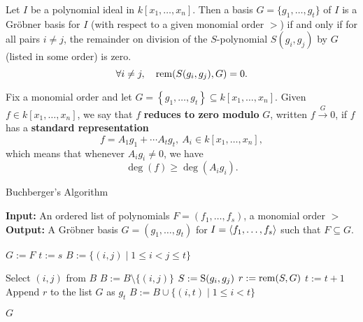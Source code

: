 \begin{theorem}\label{thm:Buchberger’s Criterion} %
    Let $I$ be a polynomial ideal in $k[x_1, \dots, x_n]$. 
    Then a basis $G = \{g_1, \dots , g_t\}$ of $I$ is a Gr{\"o}bner basis for $I$ (with respect to a given monomial order $>$)
    if and only if for all pairs $i \neq j$, the remainder on division of the $S$-polynomial $S(g_i, g_j)$ by $G$ (listed in some order) is zero.
    \[ \forall i \neq j, \quad \operatorname{rem}(S(g_i, g_j), G) = 0. \]
\end{theorem}

\begin{definition}\label{def:reduces_to_zero} %
    Fix a monomial order and let $G = \left\{g_1, \ldots , g_t\right\} \subseteq k[x_1, \ldots , x_n]$.
    Given $f \in k[x_1, \ldots , x_n]$, we say that $f$ \textbf{reduces to zero modulo} $G$, written $f \xrightarrow{G} 0$,
    if $f$ has a \textbf{standard representation}
    \[ f = A_1g_1 + \cdots A_tg_t,\ A_i \in k[x_1, \ldots , x_n],\]
    which means that whenever $A_ig_i \neq 0$, we have
    \[\operatorname{deg}(f) \geq \operatorname{deg}(A_ig_i).\]
\end{definition}

\begin{latexonly}
\begin{algorithm}\label{alg:Buchberger's_Algorithm} %
    \caption{Buchberger's Algorithm}
    \begin{algorithmic}[1]
    \Statex \textbf{Input:} An ordered list of polynomials $F = (f_1, \dots, f_s)$, a monomial order $>$
    \Statex \textbf{Output:} A Gr{\"o}bner basis $G = (g_1, \dots, g_t)$ for $I = \langle f_1, \dots, f_s \rangle$ such that $F \subseteq G$.
    
    \State $G := F$ 
    \State $t := s$ 
    \State $B := \{(i, j) \mid 1 \le i < j \le t\}$ 
    
        \State Select $(i, j)$ from $B$
        \State $B := B \setminus \{(i, j)\}$
        \State $S := \operatorname{S}(g_i, g_j)$ 
        \State $r := \operatorname{rem}(S, G)$ 
            \State $t := t + 1$
            \State Append $r$ to the list $G$ as $g_t$ 
            \State $B := B \cup \{(i, t) \mid 1 \le i < t\}$ 
        \EndIf
    \EndWhile
    
    \State \Return $G$
    \end{algorithmic}
\end{algorithm}
\end{latexonly}


